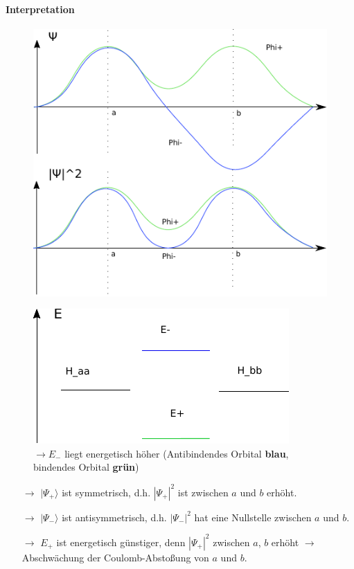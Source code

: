 \paragraph{Interpretation}

\begin{figure}[H]
	\centering
	\includegraphics{figures/1_4Graph.pdf}
	\caption{}
	\label{}
\end{figure}

\begin{figure}[H]
	\centering
	\includegraphics{figures/1_4Energie.pdf}
	\caption{$\rightarrow E_-$ liegt energetisch höher (Antibindendes Orbital \textbf{blau}, bindendes Orbital \textbf{grün})}
	\label{}
\end{figure}
\begin{itemize}
	\item[$\rightarrow$] $\vert\Psi_+\rangle$ ist symmetrisch, d.h. $|\Psi_+|^2$ ist zwischen $a$ und $b$ erhöht.
	\item[$\rightarrow$] $\vert\Psi_-\rangle$ ist antisymmetrisch, d.h. $|\Psi_-|^2$ hat eine Nullstelle zwischen $a$ und $b$.
	\item[$\rightarrow$] $E_+$ ist energetisch günstiger, denn $|\Psi_+|^2$ zwischen $a$, $b$ erhöht $\rightarrow$ Abschwächung der Coulomb-Abstoßung von $a$ und $b$.
\end{itemize}


